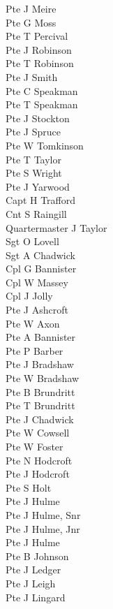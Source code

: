 \begin{multicols}{3}
  Pte J Meire \\
  Pte G Moss \\
  Pte T Percival \\
  Pte J Robinson \\
  Pte T Robinson \\
  Pte J Smith \\
  Pte C Speakman \\
  Pte T Speakman \\
  Pte J Stockton \\
  Pte J Spruce \\
  Pte W Tomkinson \\
  Pte T Taylor \\
  Pte S Wright \\
  Pte J Yarwood \\
  Capt H Trafford \\
  Cnt S Raingill \\
  Quartermaster J Taylor \\
  Sgt O Lovell \\
  Sgt A Chadwick \\
  Cpl G Bannister \\
  Cpl W Massey \\
  Cpl J Jolly \\
  Pte J Ashcroft \\
  Pte W Axon \\
  Pte A Bannister \\
  Pte P Barber \\
  Pte J Bradshaw \\
  Pte W Bradshaw \\
  Pte B Brundritt \\
  Pte T Brundritt \\
  Pte J Chadwick \\
  Pte W Cowsell \\
  Pte W Foster \\
  Pte N Hodcroft \\
  Pte J Hodcroft \\
  Pte S Holt \\
  Pte J Hulme \\
  Pte J Hulme, Snr \\
  Pte J Hulme, Jnr \\
  Pte J Hulme \\
  Pte B Johnson \\
  Pte J Ledger \\
  Pte J Leigh \\
  Pte J Lingard \\

\end{multicols}
